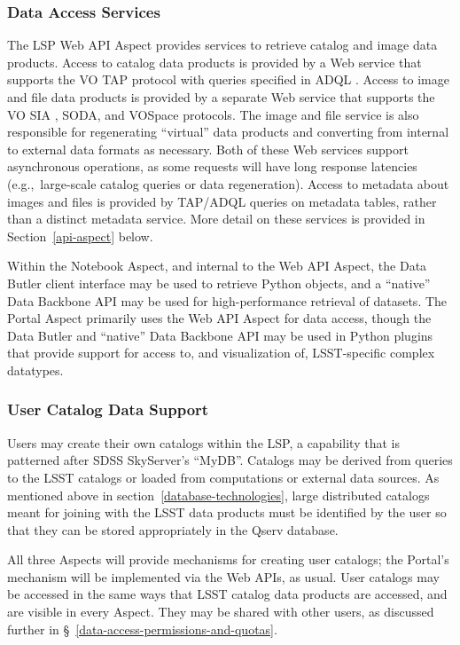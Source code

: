 \subsubsection{Data Access Services}\label{data-access-services}

The LSP Web API Aspect provides services to retrieve catalog and image data
products.
Access to catalog data products is provided by a Web service that
supports the VO TAP protocol \citep{2010ivoa.spec.0327D} with queries specified
in ADQL \citep{2008ivoa.spec.1030O}.
Access to image
and file data products is provided by a separate Web service that supports the
VO SIA \citep{2015ivoa.spec.1223D}, SODA, and VOSpace \citep{2013ivoa.spec.0329G} protocols.
The image and file service is also
responsible for regenerating ``virtual'' data products and converting from
internal to external data formats as necessary.
Both of these Web services
support asynchronous operations, as some requests will have long response
latencies (e.g.,\  large-scale catalog queries or data regeneration).
Access to
metadata about images and files is provided by TAP/ADQL queries on metadata
tables, rather than a distinct metadata service.  More detail on these services
is provided in Section~\ref{api-aspect} below.

Within the Notebook Aspect, and internal to the Web API Aspect, the Data
Butler client interface may be used to retrieve Python objects, and a
``native'' Data Backbone API may be used for high-performance retrieval of
datasets.
The Portal Aspect primarily uses the Web API Aspect for data access,
though the Data Butler and ``native'' Data Backbone API may be used in Python
plugins that provide support for access to, and visualization of, LSST-specific
complex datatypes.

\subsubsection{User Catalog Data Support}\label{user-catalog-data-support}

Users may create their own catalogs within the LSP, a capability that is
patterned after SDSS SkyServer's ``MyDB''.
Catalogs may be derived from queries
to the LSST catalogs or loaded from computations or external data sources.  As
mentioned above in section~\ref{database-technologies}, large distributed
catalogs meant for joining with the LSST data products must be identified by
the user so that they can be stored appropriately in the Qserv database.

All three Aspects will provide mechanisms for creating user catalogs; the
Portal's mechanism will be implemented via the Web APIs, as usual.
User catalogs may be accessed in the same ways that LSST catalog data products
are accessed, and are visible in every Aspect.
They may be shared with other users, as discussed further in
\S~\ref{data-access-permissions-and-quotas}.

